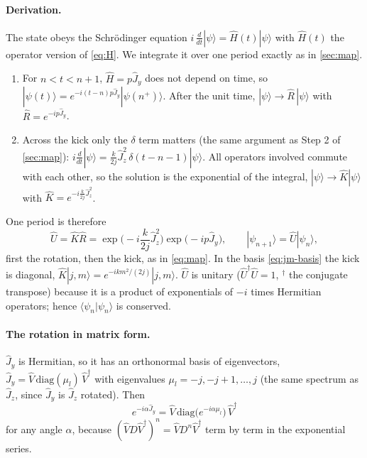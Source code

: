\documentclass[11pt,a4paper]{article}
\begin{document}
\paragraph{Derivation.} The state obeys the Schrödinger equation $i\,\frac{d}{dt}|\psi\rangle = \hat H(t)|\psi\rangle$
with $\hat H(t)$ the operator version of \eqref{eq:H}. We integrate it over one period exactly as in \cref{sec:map}.
\begin{enumerate}
  \item For $n < t < n+1$, $\hat H = p\hat J_y$ does not depend on time, so $|\psi(t)\rangle = e^{-i(t-n)p\hat
  J_y}|\psi(n^+)\rangle$. After the unit time, $|\psi\rangle \to \hat R\,|\psi\rangle$ with $\hat R = e^{-ip\hat J_y}$.
  \item Across the kick only the $\delta$ term matters (the same argument as Step 2 of \cref{sec:map}):
  $i\frac{d}{dt}|\psi\rangle = \frac{k}{2j}\hat J_z^2\,\delta(t-n-1)|\psi\rangle$. All operators involved commute
  with each other, so the solution is the exponential of the integral,
  $|\psi\rangle \to \hat K|\psi\rangle$ with $\hat K = e^{-i\frac{k}{2j}\hat J_z^2}$.
\end{enumerate}
One period is therefore
\begin{equation}\label{eq:floquet}
  \boxed{\hat U = \hat K\hat R = \exp\!\Big(-i\frac{k}{2j}\hat J_z^2\Big)\exp\!\big(-ip\hat J_y\big), \qquad
  |\psi_{n+1}\rangle = \hat U|\psi_n\rangle ,}
\end{equation}
first the rotation, then the kick, as in \eqref{eq:map}. In the basis \eqref{eq:jm-basis} the kick is diagonal,
$\hat K|j,m\rangle = e^{-ikm^2/(2j)}|j,m\rangle$. $\hat U$ is unitary ($\hat U^\dagger\hat U = 1$, $^\dagger$ the conjugate
transpose) because it is a product of exponentials of $-i$ times Hermitian operators; hence $\langle\psi_n|\psi_n\rangle$
is conserved.

\paragraph{The rotation in matrix form.} $\hat J_y$ is Hermitian, so it has an orthonormal basis of eigenvectors,
$\hat J_y = \hat V\,\mathrm{diag}(\mu_l)\,\hat V^\dagger$ with eigenvalues $\mu_l = -j, -j+1, \dots, j$ (the same
spectrum as $\hat J_z$, since $\hat J_y$ is $\hat J_z$ rotated). Then
\begin{equation}\label{eq:exp-jy}
  e^{-i\alpha\hat J_y} = \hat V\,\mathrm{diag}\big(e^{-i\alpha\mu_l}\big)\,\hat V^\dagger
\end{equation}
for any angle $\alpha$, because $(\hat V D\hat V^\dagger)^n = \hat V D^n\hat V^\dagger$ term by term in the exponential
series.
\end{document}
